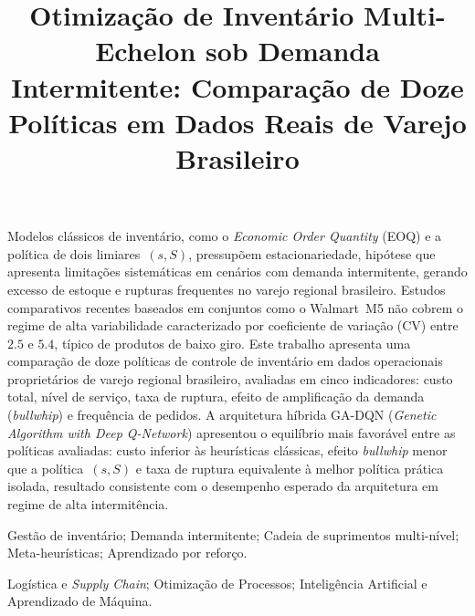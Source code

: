 \documentclass[a4paper,11pt]{article}
\title{Otimização de Inventário Multi-Echelon sob Demanda Intermitente: Comparação de Doze Políticas em Dados Reais de Varejo Brasileiro}
\author{
\name{}
\institute{Filiação}
\iaddress{Endereço da Instituição}
\email{e-mail}
}
\author{
\name{Segundo Autor}
\institute{Filiação}
\iaddress{Endereço da Instituição}
\email{e-mail}
}
\begin{document}
\maketitle

\vspace{8mm}
\begin{resumo}
Modelos clássicos de inventário, como o \textit{Economic Order Quantity}
(EOQ) e a política de dois limiares~$(s,S)$, pressupõem
estacionariedade, hipótese que apresenta limitações sistemáticas
em cenários com demanda intermitente, gerando excesso de estoque
e rupturas frequentes no varejo regional brasileiro. Estudos comparativos recentes baseados em
conjuntos como o Walmart~M5 não cobrem o regime de alta variabilidade
caracterizado por coeficiente de variação (CV) entre $2.5$ e $5.4$,
típico de produtos de baixo giro. Este trabalho apresenta uma
comparação de doze políticas de controle de inventário em dados
operacionais proprietários de varejo regional brasileiro, avaliadas
em cinco indicadores: custo total, nível de serviço, taxa de ruptura,
efeito de amplificação da demanda (\textit{bullwhip}) e frequência
de pedidos. A arquitetura híbrida GA-DQN
(\textit{Genetic Algorithm with Deep Q-Network}) apresentou o
equilíbrio mais favorável entre as políticas avaliadas: custo
inferior às heurísticas clássicas, efeito \textit{bullwhip} menor
que a política~$(s,S)$ e taxa de ruptura equivalente à melhor
política prática isolada, resultado consistente com o desempenho
esperado da arquitetura em regime de alta intermitência.
\end{resumo}


\bigskip
\begin{palchaves}
Gestão de inventário; Demanda intermitente; Cadeia de suprimentos
multi-nível; Meta-heurísticas; Aprendizado por reforço.

\bigskip
{}
Logística e \textit{Supply Chain}; Otimização de Processos;
Inteligência Artificial e Aprendizado de Máquina.
\end{palchaves}
\end{document}
